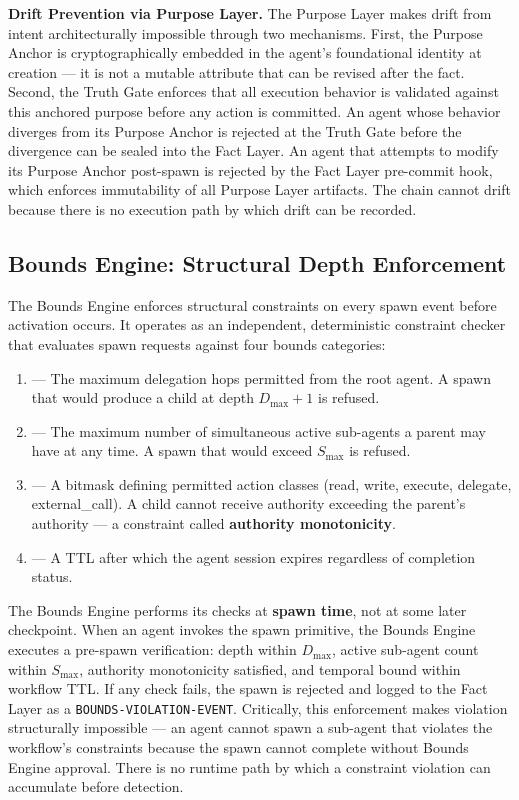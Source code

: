 \bigskip
\noindent\textbf{Drift Prevention via Purpose Layer.}
The Purpose Layer makes drift from intent architecturally impossible through two mechanisms. First, the Purpose Anchor is cryptographically embedded in the agent's foundational identity at creation — it is not a mutable attribute that can be revised after the fact. Second, the Truth Gate enforces that all execution behavior is validated against this anchored purpose before any action is committed. An agent whose behavior diverges from its Purpose Anchor is rejected at the Truth Gate before the divergence can be sealed into the Fact Layer. An agent that attempts to modify its Purpose Anchor post-spawn is rejected by the Fact Layer pre-commit hook, which enforces immutability of all Purpose Layer artifacts. The chain cannot drift because there is no execution path by which drift can be recorded.

\subsection{Bounds Engine: Structural Depth Enforcement}

The Bounds Engine enforces structural constraints on every spawn event before activation occurs. It operates as an independent, deterministic constraint checker that evaluates spawn requests against four bounds categories:

\begin{enumerate}
  \item[\textbf{Depth Bound ($D_{\max}$)}] — The maximum delegation hops permitted from the root agent. A spawn that would produce a child at depth $D_{\max} + 1$ is refused.
  \item[\textbf{Scope Bound ($S_{\max}$)}] — The maximum number of simultaneous active sub-agents a parent may have at any time. A spawn that would exceed $S_{\max}$ is refused.
  \item[\textbf{Authority Bound}] — A bitmask defining permitted action classes (read, write, execute, delegate, external\_call). A child cannot receive authority exceeding the parent's authority — a constraint called \textbf{authority monotonicity}.
  \item[\textbf{Temporal Bound}] — A TTL after which the agent session expires regardless of completion status.
\end{enumerate}

The Bounds Engine performs its checks at \textbf{spawn time}, not at some later checkpoint. When an agent invokes the spawn primitive, the Bounds Engine executes a pre-spawn verification: depth within $D_{\max}$, active sub-agent count within $S_{\max}$, authority monotonicity satisfied, and temporal bound within workflow TTL. If any check fails, the spawn is rejected and logged to the Fact Layer as a \texttt{BOUNDS-VIOLATION-EVENT}. Critically, this enforcement makes violation structurally impossible — an agent cannot spawn a sub-agent that violates the workflow's constraints because the spawn cannot complete without Bounds Engine approval. There is no runtime path by which a constraint violation can accumulate before detection.

